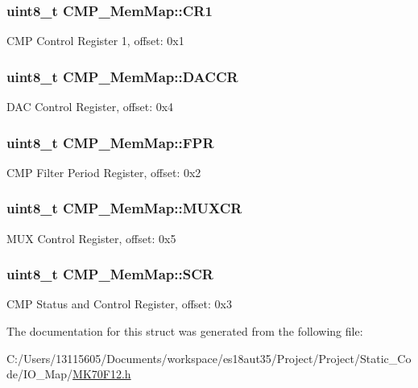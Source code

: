 \subsubsection[{C\+R1}]{\setlength{\rightskip}{0pt plus 5cm}uint8\+\_\+t C\+M\+P\+\_\+\+Mem\+Map\+::\+C\+R1}\label{struct_c_m_p___mem_map_ab790f5d18ef53ba0c9cfc2b5f3ce6668}
C\+M\+P Control Register 1, offset\+: 0x1 \hypertarget{struct_c_m_p___mem_map_a64ad86546fe53058b6fdd5ca1252f7c2}{}
\subsubsection[{D\+A\+C\+C\+R}]{\setlength{\rightskip}{0pt plus 5cm}uint8\+\_\+t C\+M\+P\+\_\+\+Mem\+Map\+::\+D\+A\+C\+C\+R}\label{struct_c_m_p___mem_map_a64ad86546fe53058b6fdd5ca1252f7c2}
D\+A\+C Control Register, offset\+: 0x4 \hypertarget{struct_c_m_p___mem_map_aa793447f43fa77759b6eaf1620bed4bc}{}
\subsubsection[{F\+P\+R}]{\setlength{\rightskip}{0pt plus 5cm}uint8\+\_\+t C\+M\+P\+\_\+\+Mem\+Map\+::\+F\+P\+R}\label{struct_c_m_p___mem_map_aa793447f43fa77759b6eaf1620bed4bc}
C\+M\+P Filter Period Register, offset\+: 0x2 \hypertarget{struct_c_m_p___mem_map_a3b48de300c4b4116ebb942659a2948a2}{}
\subsubsection[{M\+U\+X\+C\+R}]{\setlength{\rightskip}{0pt plus 5cm}uint8\+\_\+t C\+M\+P\+\_\+\+Mem\+Map\+::\+M\+U\+X\+C\+R}\label{struct_c_m_p___mem_map_a3b48de300c4b4116ebb942659a2948a2}
M\+U\+X Control Register, offset\+: 0x5 \hypertarget{struct_c_m_p___mem_map_a3fe55f0243869b50fc54acb9c194d970}{}
\subsubsection[{S\+C\+R}]{\setlength{\rightskip}{0pt plus 5cm}uint8\+\_\+t C\+M\+P\+\_\+\+Mem\+Map\+::\+S\+C\+R}\label{struct_c_m_p___mem_map_a3fe55f0243869b50fc54acb9c194d970}
C\+M\+P Status and Control Register, offset\+: 0x3 

The documentation for this struct was generated from the following file\+:\begin{DoxyCompactItemize}
\item 
C\+:/\+Users/13115605/\+Documents/workspace/es18aut35/\+Project/\+Project/\+Static\+\_\+\+Code/\+I\+O\+\_\+\+Map/\hyperlink{_m_k70_f12_8h}{M\+K70\+F12.\+h}\end{DoxyCompactItemize}

